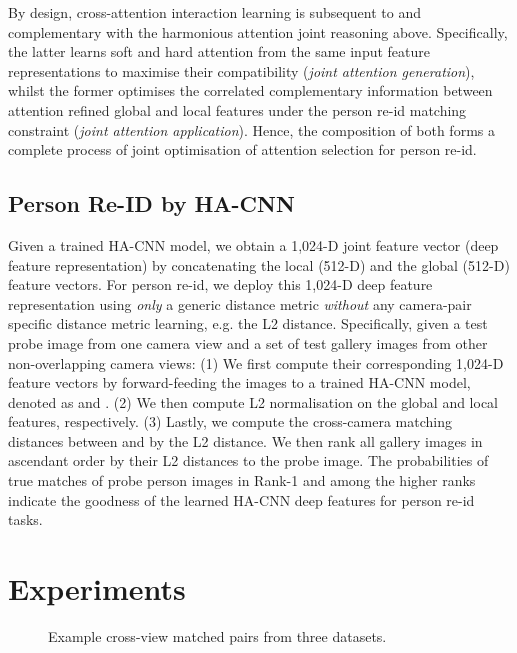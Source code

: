 \documentclass[10pt,twocolumn,letterpaper]{article}
\begin{document}
\vspace{0.01cm}
By design, cross-attention interaction learning is subsequent to and complementary
with the harmonious attention joint reasoning above. Specifically,
the latter learns soft and hard attention from
the same input feature representations to maximise their compatibility 
({\em joint attention generation}), whilst the former 
optimises the correlated complementary information between 
attention refined global and local features 
under the person re-id matching constraint
({\em joint attention application}).
Hence, the composition of both forms a complete process of 
joint optimisation of attention selection
for person re-id.
\subsection{Person Re-ID by HA-CNN}
Given a trained HA-CNN model,
we obtain a 1,024-D joint feature vector (deep feature representation)
by concatenating the local (512-D) and the global (512-D) feature vectors.
For person re-id, we deploy this 1,024-D deep feature representation using {\em only}
a generic distance metric {\em without} any camera-pair specific distance
metric learning, e.g. the L2 distance.
Specifically, given a test probe image  from one camera view
and a set of test gallery images 
 from other non-overlapping camera views:
(1) We first compute their corresponding 1,024-D feature vectors by
forward-feeding the images to a trained HA-CNN model, 
denoted as  and 
. 
(2) We then compute L2 normalisation on the global and local features,
respectively. 
(3) Lastly, we compute the cross-camera matching
distances between  and  by the L2 distance. 
We then rank all
gallery images in ascendant order by their L2 distances to the probe image.  
The probabilities of true matches of probe person images in Rank-1 and
among the higher ranks indicate the goodness of the learned
HA-CNN deep features for person re-id tasks. 


\section{Experiments}
\label{exp}
\vspace{-0.3cm}
\begin{figure} [ht]
	\centering
	\vskip -0.1cm
	\caption{ Example cross-view matched pairs from three datasets.
	}
	\label{fig:dataset}
	\vspace{-0.3cm}
\end{figure}
\end{document}
